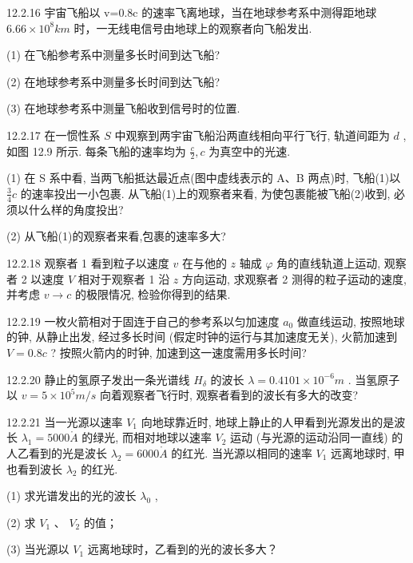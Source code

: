 \begin{problem}{12.2.16}
宇宙飞船以 v=0.8c 的速率飞离地球，当在地球参考系中测得距地球 $6.66 \times 10^{8} km$ 时，一无线电信号由地球上的观察者向飞船发出.

(1) 在飞船参考系中测量多长时间到达飞船?

(2) 在地球参考系中测量多长时间到达飞船?

(3) 在地球参考系中测量飞船收到信号时的位置.
\end{problem}
\clearpage


\begin{problem}{12.2.17}
在一惯性系 $S$ 中观察到两宇宙飞船沿两直线相向平行飞行, 轨道间距为 $d$ , 如图 12.9 所示. 每条飞船的速率均为 $\frac{c}{2}, c$ 为真空中的光速.

(1) 在 S 系中看, 当两飞船抵达最近点(图中虚线表示的 A、B 两点)时, 飞船(1)以 $\frac{3}{4}c$ 的速率投出一小包裹. 从飞船(1)上的观察者来看, 为使包裹能被飞船(2)收到, 必须以什么样的角度投出?

(2) 从飞船(1)的观察者来看,包裹的速率多大?
\begin{center}

\end{center}
\end{problem}
\clearpage


\begin{problem}{12.2.18}
观察者 1 看到粒子以速度 $v$ 在与他的 $z$ 轴成 $\varphi$ 角的直线轨道上运动, 观察者 2 以速度 $V$ 相对于观察者 1 沿 $z$ 方向运动, 求观察者 2 测得的粒子运动的速度, 并考虑 $v \to c$ 的极限情况, 检验你得到的结果.
\end{problem}
\clearpage


\begin{problem}{12.2.19}
一枚火箭相对于固连于自己的参考系以匀加速度 $a_0$ 做直线运动, 按照地球的钟, 从静止出发, 经过多长时间 (假定时钟的运行与其加速度无关), 火箭加速到 $V = 0.8c$ ? 按照火箭内的时钟, 加速到这一速度需用多长时间?
\end{problem}
\clearpage


\begin{problem}{12.2.20}
静止的氢原子发出一条光谱线 $H_{\delta}$ 的波长 $\lambda=0.4101\times10^{-6}m$ . 当氢原子以 $v=5\times10^{5}m/s$ 向着观察者飞行时, 观察者看到的波长有多大的改变?
\end{problem}
\clearpage


\begin{problem}{12.2.21}
当一光源以速率 $V_{1}$ 向地球靠近时, 地球上静止的人甲看到光源发出的是波长 $\lambda_{1}=5000\mathring{A}$ 的绿光, 而相对地球以速率 $V_{2}$ 运动 (与光源的运动沿同一直线) 的人乙看到的光是波长 $\lambda_{2}=6000\mathring{A}$ 的红光. 当光源以相同的速率 $V_{1}$ 远离地球时, 甲也看到波长 $\lambda_{2}$ 的红光.

(1) 求光谱发出的光的波长 $\lambda_{0}$ ,

(2) 求 $V_{1}$ 、 $V_{2}$ 的值；

(3) 当光源以 $V_{1}$ 远离地球时，乙看到的光的波长多大？
\end{problem}
\clearpage


